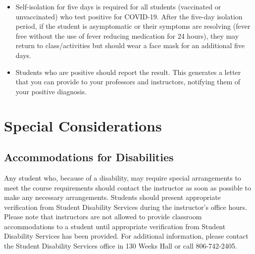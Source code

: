 \documentclass[12pt, notitlepage]{article}   	%
\begin{document}
{\begin{itemize}
{\begin{itemize}
{				\begin{itemize}
					\item{Quarantine for at least five days.}
					\item{Wear a well-fitting (preferably N95 or KN95) mask if you must be around others.}
					\item{Do not travel.}
					\item{Get tested at least five days after exposure.}
				\end{itemize}
			}
			\item{If you are exposed and are up to date on vaccinations and boosters:
				\begin{itemize}
					\item{No quarantine is necessary unless you develop symptoms.}
					\item{Get tested at least five days after exposure.}
				\end{itemize}
			}
			\item{If you exposed and have had confirmed COVID-19 within the past 90 days:
				\begin{itemize}
					\item{No quarantine is necessary unless you develop symptoms.}
				\end{itemize}
			}
		\end{itemize}
	}
	\item{Self-isolation for five days is required for all students 
			(vaccinated or unvaccinated) who test positive for COVID-19. 
			After the five-day isolation period, if the student is asymptomatic or 
			their symptoms are resolving (fever free without the use of fever reducing 
			medication for 24 hours), they may return to class/activities but should 
			wear a face mask for an additional five days.}
	\item{Students who are positive should report the result. 
			This generates a letter that you can provide to your professors and 
			instructors, notifying them of your positive diagnosis.}
\end{itemize}

\section{Special Considerations}
\subsection{Accommodations for Disabilities}
Any student who, because of a disability, may require special arrangements to meet the 
course requirements should contact the instructor as soon as possible to make any 
necessary arrangements. 
Students should present appropriate verification from Student Disability Services 
during the instructor’s office hours. 
Please note that instructors are not allowed to provide classroom accommodations 
to a student until appropriate verification from Student Disability Services has been provided. 
For additional information, please contact the Student Disability Services office in 130 
Weeks Hall or call 806-742-2405.

}
\end{document}
